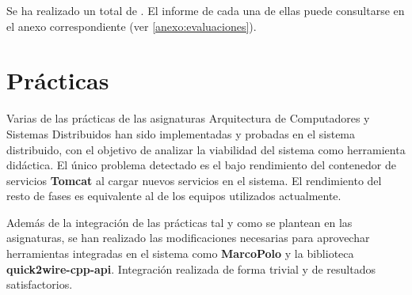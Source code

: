 Se ha realizado un total de . El informe de cada una de ellas puede consultarse en el anexo correspondiente (ver \ref{anexo:evaluaciones}).

\section{Prácticas}

Varias de las prácticas de las asignaturas Arquitectura de Computadores y Sistemas Distribuidos han sido implementadas y probadas en el sistema distribuido, con el objetivo de analizar la viabilidad del sistema como herramienta didáctica. El único problema detectado es el bajo rendimiento del contenedor de servicios \textbf{Tomcat} al cargar nuevos servicios en el sistema. El rendimiento del resto de fases es equivalente al de los equipos utilizados actualmente.

Además de la integración de las prácticas tal y como se plantean en las asignaturas, se han realizado las modificaciones necesarias para aprovechar herramientas integradas en el sistema como \textbf{MarcoPolo} y la biblioteca \textbf{quick2wire-cpp-api}. Integración realizada de forma trivial y de resultados satisfactorios.